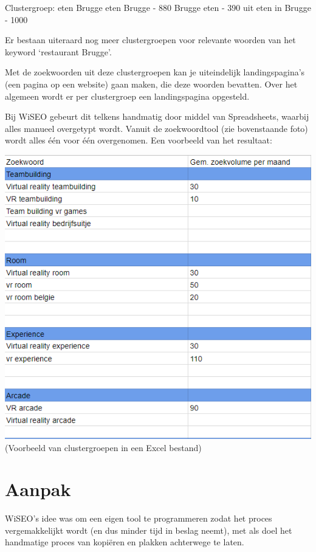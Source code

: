 Clustergroep: eten Brugge
eten Brugge - 880
Brugge eten - 390
uit eten in Brugge - 1000

Er bestaan uiteraard nog meer  clustergroepen voor relevante woorden van het keyword ‘restaurant Brugge’. 

Met de zoekwoorden uit deze clustergroepen kan je uiteindelijk landingspagina’s (een pagina op een website) gaan maken, die deze woorden bevatten. Over het algemeen wordt er per clustergroep een landingspagina opgesteld.  

Bij WiSEO gebeurt dit telkens handmatig door middel van Spreadsheets, waarbij alles manueel overgetypt wordt. Vanuit de zoekwoordtool (zie bovenstaande foto) wordt alles één voor één overgenomen. Een voorbeeld van het resultaat: 

\includegraphics[width=\linewidth]{Bachelorproef/bachelor/img/Clustergroepenvoorbeeld.png}
(Voorbeeld van clustergroepen in een Excel bestand)

\section{Aanpak}
\label{ch: Aanpak}

WiSEO's idee was om een eigen tool te programmeren zodat het proces vergemakkelijkt wordt (en dus minder tijd in beslag neemt), met als doel het handmatige proces van kopiëren en plakken achterwege te laten. 

